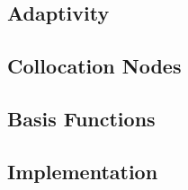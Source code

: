 \subsection{Adaptivity} 


\subsection{Collocation Nodes} 


\subsection{Basis Functions} 


\subsection{Implementation}

